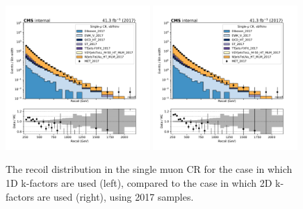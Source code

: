 \begin{figure}
    \begin{center}
        \includegraphics[width=0.49\textwidth]{fig/datamc/cr_1m_vbf/cr_1m_vbf_recoil_losf_2017.pdf}
        \includegraphics[width=0.49\textwidth]{fig/datamc_2dkfac/cr_1m_vbf/cr_1m_vbf_recoil_losf_2017.pdf} 
        \caption{The recoil distribution in the single muon CR for the case in which 1D k-factors are used (left), 
        compared to the case in which 2D k-factors are used (right), using 2017 samples.}
        \label{fig:recoil_2017}
    \end{center}
\end{figure}

